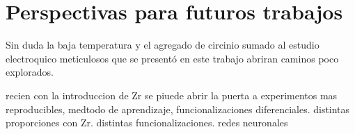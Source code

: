 \section*{Perspectivas para futuros trabajos}

Sin duda la baja temperatura y el agregado de circinio sumado al estudio electroquico meticulosos que se presentó en este trabajo abriran caminos poco explorados.

recien con la introduccion de Zr se piuede abrir la puerta a experimentos mas reproducibles, medtodo de aprendizaje, funcionalizaciones diferenciales. distintas proporciones con Zr. distintas funcionalizaciones.
redes neuronales

\newpage

